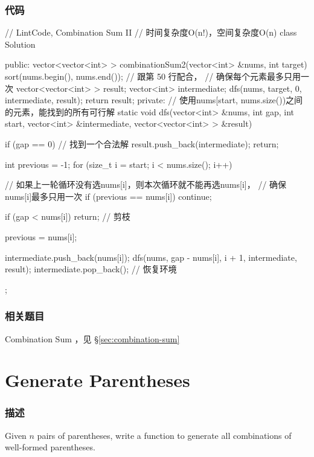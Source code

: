 \subsubsection{代码}
\begin{Code}
// LintCode, Combination Sum II
// 时间复杂度O(n!)，空间复杂度O(n)
class Solution {
public:
    vector<vector<int> > combinationSum2(vector<int> &nums, int target) {
        sort(nums.begin(), nums.end()); // 跟第 50 行配合，
                                             // 确保每个元素最多只用一次
        vector<vector<int> > result;
        vector<int> intermediate;
        dfs(nums, target, 0, intermediate, result);
        return result;
    }
private:
    // 使用nums[start, nums.size())之间的元素，能找到的所有可行解
    static void dfs(vector<int> &nums, int gap, int start,
            vector<int> &intermediate, vector<vector<int> > &result) {
        if (gap == 0) {  //  找到一个合法解
            result.push_back(intermediate);
            return;
        }

        int previous = -1;
        for (size_t i = start; i < nums.size(); i++) {
            // 如果上一轮循环没有选nums[i]，则本次循环就不能再选nums[i]，
            // 确保nums[i]最多只用一次
            if (previous == nums[i]) continue;

            if (gap < nums[i]) return;  // 剪枝

            previous = nums[i];

            intermediate.push_back(nums[i]);
            dfs(nums, gap - nums[i], i + 1, intermediate, result);
            intermediate.pop_back();  // 恢复环境
        }
    }
};
\end{Code}


\subsubsection{相关题目}
\begindot
\item Combination Sum ，见 \S \ref{sec:combination-sum}
\myenddot


\section{Generate Parentheses } %
\label{sec:generate-parentheses}


\subsubsection{描述}
Given $n$ pairs of parentheses, write a function to generate all combinations of well-formed parentheses.

